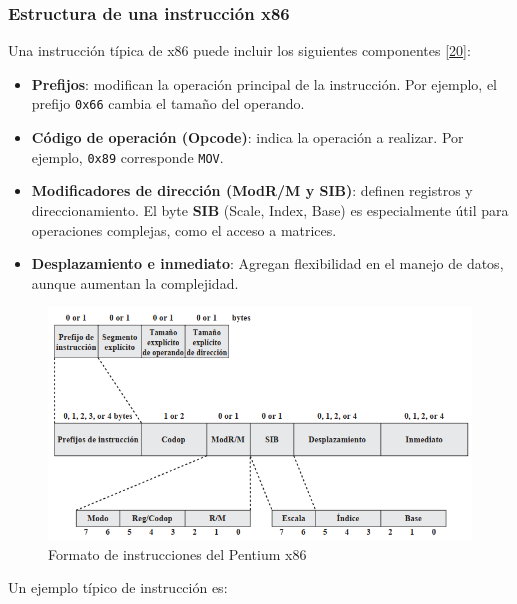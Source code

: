 \documentclass[12pt,oneside]{templates/unerthesis}
\providecommand{\tightlist}{%
  \setlength{\itemsep}{0pt}\setlength{\parskip}{0pt}}
\begin{document}
\hypertarget{estructura-de-una-instrucciuxf3n-x86}{%
\subsubsection{Estructura de una instrucción x86}\label{estructura-de-una-instrucciuxf3n-x86}}

Una instrucción típica de x86 puede incluir los siguientes componentes \protect\hyperlink{ref-stallings_computer_2021}{{[}20{]}}:

\begin{itemize}
\tightlist
\item
  \textbf{Prefijos}: modifican la operación principal de la instrucción. Por ejemplo, el prefijo \texttt{0x66} cambia el tamaño del operando.
\item
  \textbf{Código de operación (Opcode)}: indica la operación a realizar. Por ejemplo, \texttt{0x89} corresponde \texttt{MOV}.
\item
  \textbf{Modificadores de dirección (ModR/M y SIB)}: definen registros y direccionamiento. El byte \textbf{SIB} (Scale, Index, Base) es especialmente útil para operaciones complejas, como el acceso a matrices.
\item
  \textbf{Desplazamiento e inmediato}: Agregan flexibilidad en el manejo de datos, aunque aumentan la complejidad.
\end{itemize}

\begin{figure}

{\centering \includegraphics[width=1\linewidth]{images/formatoinstruccionx86} 

}

\caption{Formato de instrucciones del Pentium x86}\label{fig:FormatoInst}
\end{figure}

Un ejemplo típico de instrucción es:
\end{document}
